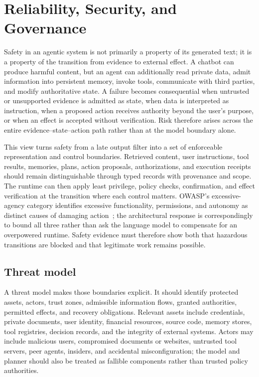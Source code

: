 \section{Reliability, Security, and Governance}
\label{sec:safety}

Safety in an agentic system is not primarily a property of its generated text; it is a property of the transition from evidence to external effect. A chatbot can produce harmful content, but an agent can additionally read private data, admit information into persistent memory, invoke tools, communicate with third parties, and modify authoritative state. A failure becomes consequential when untrusted or unsupported evidence is admitted as state, when data is interpreted as instruction, when a proposed action receives authority beyond the user's purpose, or when an effect is accepted without verification. Risk therefore arises across the entire evidence--state--action path rather than at the model boundary alone.

This view turns safety from a late output filter into a set of enforceable representation and control boundaries. Retrieved content, user instructions, tool results, memories, plans, action proposals, authorizations, and execution receipts should remain distinguishable through typed records with provenance and scope. The runtime can then apply least privilege, policy checks, confirmation, and effect verification at the transition where each control matters. OWASP's excessive-agency category identifies excessive functionality, permissions, and autonomy as distinct causes of damaging action~\cite{owasp2025llmtop10}; the architectural response is correspondingly to bound all three rather than ask the language model to compensate for an overpowered runtime. Safety evidence must therefore show both that hazardous transitions are blocked and that legitimate work remains possible.

\subsection{Threat model}

A threat model makes those boundaries explicit. It should identify protected assets, actors, trust zones, admissible information flows, granted authorities, permitted effects, and recovery obligations. Relevant assets include credentials, private documents, user identity, financial resources, source code, memory stores, tool registries, decision records, and the integrity of external systems. Actors may include malicious users, compromised documents or websites, untrusted tool servers, peer agents, insiders, and accidental misconfiguration; the model and planner should also be treated as fallible components rather than trusted policy authorities.

